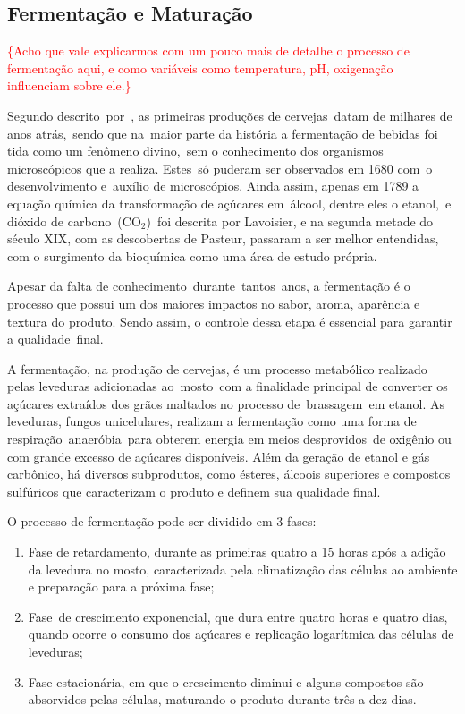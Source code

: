 \subsection{Fermentação e Maturação}

\textcolor{red}{\{Acho que vale explicarmos com um pouco mais de detalhe o processo de fermentação aqui, e como variáveis como temperatura, pH, oxigenação influenciam sobre ele.\}}

Segundo descrito por , as primeiras produções de
cervejas datam de milhares de anos atrás, sendo que na maior parte da história a
fermentação de bebidas foi tida como um fenômeno divino, sem o conhecimento dos
organismos microscópicos que a realiza. Estes só puderam ser observados em 1680
com o desenvolvimento e auxílio de microscópios. Ainda assim, apenas em 1789 a
equação química da transformação de açúcares em álcool, dentre eles o etanol, e
dióxido de carbono ($\mathrm{CO_2}$) foi descrita por Lavoisier, e na segunda metade do século
XIX, com as descobertas de Pasteur, passaram a ser melhor entendidas, com o
surgimento da bioquímica como uma área de estudo própria. 


Apesar da falta de conhecimento durante tantos anos, a fermentação é o processo
que possui um dos maiores impactos no sabor, aroma, aparência e textura do
produto. Sendo assim, o controle dessa etapa é essencial para garantir a
qualidade final.  


A fermentação, na produção de cervejas, é um processo metabólico realizado pelas
leveduras adicionadas ao mosto com a finalidade principal de converter os açúcares
extraídos dos grãos maltados no processo de brassagem em etanol. As leveduras,
fungos unicelulares, realizam a fermentação como uma forma de
respiração anaeróbia para obterem energia em meios desprovidos de oxigênio ou
com grande excesso de açúcares disponíveis. Além da geração de etanol e gás
carbônico, há diversos subprodutos, como ésteres, álcoois superiores e compostos
sulfúricos que caracterizam o produto e definem sua qualidade final. 


O processo de fermentação pode ser dividido em 3 fases:  
\begin{enumerate}
    \item Fase de retardamento, durante as primeiras quatro a 15 horas após a adição
da levedura no mosto, caracterizada pela climatização das células ao
ambiente e preparação para a próxima fase;
    \item Fase de crescimento exponencial, que dura entre quatro horas e quatro dias,
quando ocorre o consumo dos açúcares e replicação logarítmica das células
de leveduras;
    \item Fase estacionária, em que o crescimento diminui e alguns compostos são
absorvidos pelas células, maturando o produto durante três a dez dias.
\end{enumerate}


